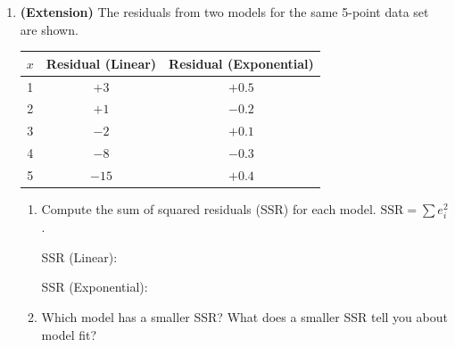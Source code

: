 \documentclass[10pt]{article}
\begin{document}
\begin{enumerate}[itemsep=16pt]
      \vspace{0.04in}
      \leavevmode{}\phantom{Answer:} \raisebox{\depth}{\gradedblank[id=hw5, type=choice, points=1, answer=C]{1.5cm}{13pt}}

\newpage
\item \textbf{(Extension)} The residuals from two models for the same 5-point data set are shown.

      \begin{center}
      \renewcommand{\arraystretch}{1.4}
      \begin{tabular}{c|c|c}
      $x$ & Residual (Linear) & Residual (Exponential) \\ \hline
      1 & $+3$  & $+0.5$ \\
      2 & $+1$  & $-0.2$ \\
      3 & $-2$  & $+0.1$ \\
      4 & $-8$  & $-0.3$ \\
      5 & $-15$ & $+0.4$ \\
      \end{tabular}
      \end{center}

      \begin{enumerate}[label=(\alph*), itemsep=6pt]
        \item Compute the sum of squared residuals (SSR) for each model.
              $\text{SSR} = \sum e_i^2$.

              \vspace{0.04in}
              SSR (Linear): \smash{\gradedblank[id=hw6a1, type=short, points=2, answer={303}]{7cm}{13pt}}

              SSR (Exponential): \smash{\gradedblank[id=hw6a2, type=short, points=2, answer={0.55}]{7cm}{13pt}}

        \item Which model has a smaller SSR? What does a smaller SSR tell you about model fit?

              \rubricbox[0.04in]{\gradedblank[id=hw6b, type=rubric, points=2,
  display={The exponential model (0.55 vs.\ 303). A smaller SSR means the predictions are closer to the actual values overall: a better fit.}]{\linewidth}{27pt}}
      \end{enumerate}

\end{enumerate}
\end{document}
